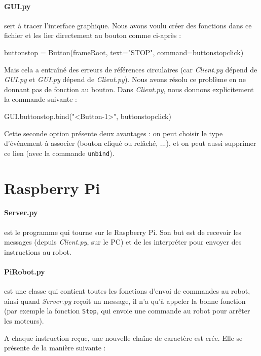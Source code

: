 \documentclass[12pt,a4paper]{report}
\begin{document}
\paragraph{GUI.py} sert à tracer l'interface graphique. Nous avons voulu créer des fonctions dans ce fichier et les lier directement au bouton comme ci-après :

\begin{verbatimtab}[3]
buttonstop = Button(frameRoot, text="STOP", command=buttonstopclick)
\end{verbatimtab}

Mais cela a entraîné des erreurs de références circulaires (car \textit{Client.py} dépend de \textit{GUI.py} et \textit{GUI.py} dépend de \textit{Client.py}). Nous avons résolu ce problème en ne donnant pas de fonction au bouton. Dans \textit{Client.py}, nous donnons explicitement la commande suivante :

\begin{verbatimtab}[3]
GUI.buttonstop.bind("<Button-1>", buttonstopclick)
\end{verbatimtab}

Cette seconde option présente deux avantages : on peut choisir le type d'événement à associer (bouton cliqué ou relâché, ...), et on peut aussi supprimer ce lien (avec la commande \verb=unbind=).

\section{Raspberry Pi}

\paragraph{Server.py} est le programme qui tourne sur le Raspberry Pi. Son but est de recevoir les messages (depuis \textit{Client.py}, sur le PC) et de les interpréter pour envoyer des instructions au robot.

\paragraph{PiRobot.py} est une classe qui contient toutes les fonctions d'envoi de commandes au robot, ainsi quand \textit{Server.py} reçoit un message, il n'a qu'à appeler la bonne fonction (par exemple la fonction \verb=Stop=, qui envoie une commande au robot pour arrêter les moteurs).

A chaque instruction reçue, une nouvelle chaîne de caractère est crée. Elle se présente de la manière suivante :
\end{document}
